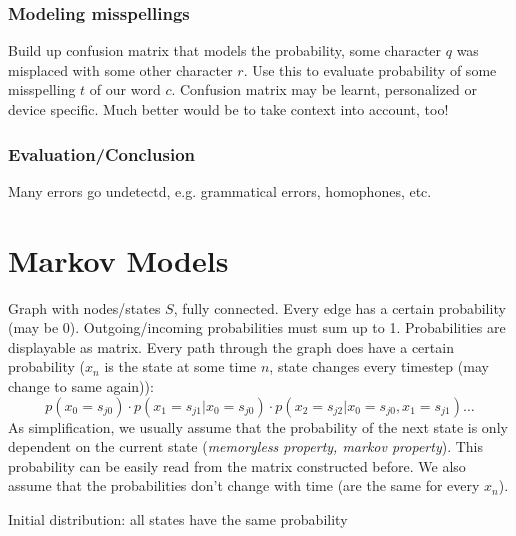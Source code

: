 \documentclass[11pt]{article}
\begin{document}
\subsubsection{Modeling misspellings}
\label{ssub:model_misspellings}
Build up confusion matrix that models the probability, some character $q$ was misplaced with some other character $r$. Use this to evaluate probability of some misspelling $t$ of our word $c$. Confusion matrix may be learnt, personalized or device specific. Much better would be to take context into account, too!


\subsubsection{Evaluation/Conclusion}
Many errors go undetectd, e.g. grammatical errors, homophones, etc.

\section{Markov Models}
\label{sec:markov_models}
Graph with nodes/states $S$, fully connected. Every edge has a certain probability 
(may be 0). Outgoing/incoming probabilities must sum up to 1. Probabilities are displayable 
as matrix. Every path through the graph does have a certain probability ($x_n$ is the state
at some time $n$, state changes every timestep (may change to same again)):
\begin{equation}
	p(x_0 = s_{j0}) \cdot p(x_1 = s_{j1} |x_0 = s_{j0}) \cdot p(x_2 = s_{j2} | x_0 = s_{j0}, x_1 = s_{j1})\ldots
\end{equation}
As simplification, we usually assume that the probability of the 
next state is only dependent on the current state (\emph{memoryless property, markov property}). This probability can be easily read from the matrix constructed before.
We also assume that the probabilities don't change with time (are the same for every $x_n$).

Initial distribution: all states have the same probability
\end{document}

